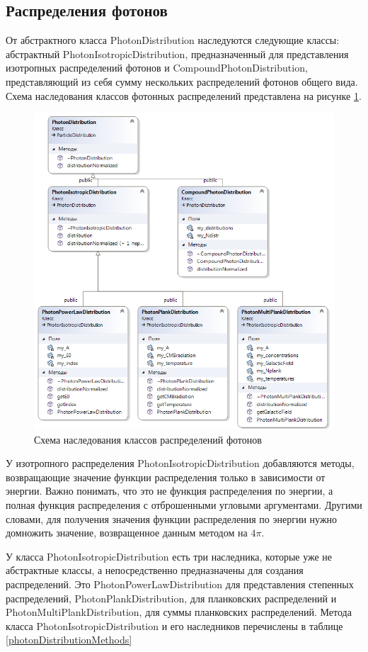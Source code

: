 \subsection{Распределения фотонов}

От абстрактного класса PhotonDistribution наследуются следующие классы: абстрактный PhotonIsotropicDistribution, предназначенный для представления изотропных распределений фотонов и CompoundPhotonDistribution, представляющий из себя сумму нескольких распределений фотонов общего вида. Схема наследования классов фотонных распределений представлена на рисунке \ref{photonDistribution}.

\begin{figure}
	\centering
	\includegraphics[width=10.5 cm]{./fig/photonDistribution1.png} 
	\caption{Схема наследования классов распределений фотонов}
	\label{photonDistribution}
\end{figure}

У изотропного распределения PhotonIsotropicDistribution добавляются методы, возвращающие значение функции распределения только в зависимости от энергии. Важно понимать, что это не функция распределения по энергии, а полная функция распределения с отброшенными угловыми аргументами. Другими словами, для получения значения функции распределения по энергии нужно домножить значение, возвращенное данным методом на $4 \pi$.

У класса PhotonIsotropicDistribution есть три наследника, которые уже не абстрактные классы, а непосредственно предназначены для создания распределений. Это PhotonPowerLawDistribution для представления степенных распределений, PhotonPlankDistribution, для планковских распределений и PhotonMultiPlankDistribution, для суммы планковских распределений. Метода класса PhotonIsotropicDistribution и его наследников перечислены в таблице \ref{photonDistributionMethods}

